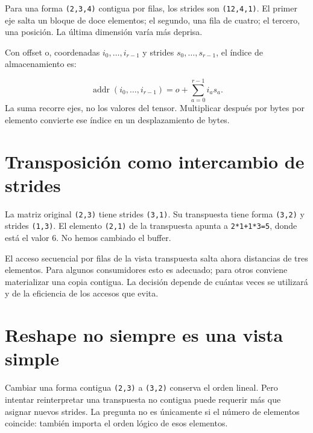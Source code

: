 \documentclass[12pt,a4paper,oneside]{report}
\begin{document}
Para una forma \texttt{(2,3,4)} contigua por filas, los strides son \texttt{(12,4,1)}. El primer eje salta un bloque de doce elementos; el segundo, una fila de cuatro; el tercero, una posición. La última dimensión varía más deprisa.

\begin{traduccion}
Con offset o, coordenadas $i_0,\ldots,i_{r-1}$ y strides $s_0,\ldots,s_{r-1}$, el índice de almacenamiento es:

\[
\operatorname{addr}(i_0,\ldots,i_{r-1})=o+\sum_{a=0}^{r-1}i_a s_a.
\]
La suma recorre ejes, no los valores del tensor. Multiplicar después por bytes por elemento convierte ese índice en un desplazamiento de bytes.

\end{traduccion}
\section{Transposición como intercambio de strides}
La matriz original \texttt{(2,3)} tiene strides \texttt{(3,1)}. Su transpuesta tiene forma \texttt{(3,2)} y strides \texttt{(1,3)}. El elemento \texttt{(2,1)} de la transpuesta apunta a \texttt{2*1+1*3=5}, donde está el valor 6. No hemos cambiado el buffer.

El acceso secuencial por filas de la vista transpuesta salta ahora distancias de tres elementos. Para algunos consumidores esto es adecuado; para otros conviene materializar una copia contigua. La decisión depende de cuántas veces se utilizará y de la eficiencia de los accesos que evita.

\begin{center}
\end{center}
\section{Reshape no siempre es una vista simple}
Cambiar una forma contigua \texttt{(2,3)} a \texttt{(3,2)} conserva el orden lineal. Pero intentar reinterpretar una transpuesta no contigua puede requerir más que asignar nuevos strides. La pregunta no es únicamente si el número de elementos coincide: también importa el orden lógico de esos elementos.
\end{document}
